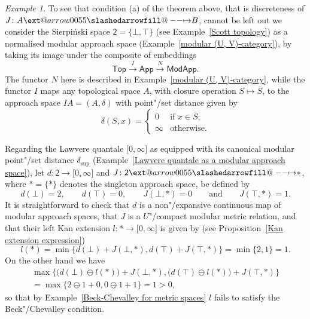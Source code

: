 \documentclass[preprint, a4paper]{elsarticle}
\makeatletter
\def\slashedarrowfill@#1#2#3#4#5{%
  $\m@th\thickmuskip0mu\medmuskip\thickmuskip\thinmuskip\thickmuskip
   \relax#5#1\mkern-7mu%
   \cleaders\hbox{$#5\mkern-2mu#2\mkern-2mu$}\hfill
   \mathclap{#3}\mathclap{#2}%
   \cleaders\hbox{$#5\mkern-2mu#2\mkern-2mu$}\hfill
   \mkern-7mu#4$%
}
\def\rightslashedarrowfill@{%
  \slashedarrowfill@\relbar\relbar\mapstochar\rightarrow}
\newcommand\xslashedrightarrow[2][]{%
  \ext@arrow 0055{\rightslashedarrowfill@}{#1}{#2}}
\def\slashedrightarrow{\xslashedrightarrow{}}
\theoremstyle{definition}
\theoremstyle{remark}
\newtheorem{example}[theorem]{Example}
\providecommand{\exref}[1]{Example~\ref{#1}}
\providecommand{\propref}[1]{Proposition~\ref{#1}}
\providecommand{\xrar}[1]{\xrightarrow{#1}}
\providecommand{\brcs}[1]{\lbrace #1 \rbrace}
\providecommand{\bigbrcs}[1]{\bigl\lbrace #1 \bigr\rbrace}
\providecommand{\brks}[1]{\lbrack #1 \rbrack}
\providecommand{\bigpars}[1]{\bigl(#1\bigr)}
\providecommand{\set}[1]{\brcs{#1}}
\providecommand{\map}[3]{#1\colon#2\to#3}
\providecommand{\hmap}[3]{#1\colon#2\slashedrightarrow#3}
\providecommand{\2}{\mathsf 2}
\providecommand{\Top}{\mathsf{Top}}
\makeatother
\begin{document}
	\begin{example} \label{counter example condition a}
		To see that condition (a) of the theorem above, that is discreteness of $\hmap JAB$, cannot be left out we consider the Sierpi\'nski space $\2 = \set{\bot, \top}$ (see \exref{Scott topology}) as a normalised modular approach space (\exref{modular (U, V)-category}), by taking its image under the composite of embeddings
		\begin{displaymath}
			\Top \xrar I \mathsf{App} \xrar N \mathsf{ModApp}.
		\end{displaymath}
		The functor $N$ here is described in \exref{modular (U, V)-category}, while the functor $I$ maps any topological space $A$, with closure operation $S \mapsto \bar S$, to the approach space $IA = (A, \delta)$ with point"/set distance given by
		\begin{displaymath}
			\delta(S, x) = \begin{cases}
				0 & \text{if $x \in \bar S$;} \\
				\infty & \text{otherwise.}
			\end{cases}
		\end{displaymath}
		
		Regarding the Lawvere quantale $\brks{0, \infty}$ as equipped with its canonical modular point"/set distance $\delta_{\sup}$ (\exref{Lawvere quantale as a modular approach space}), let $\map d\2{\brks{0,\infty}}$ and $\hmap J\2*$, where $* = \set*$ denotes the singleton approach space, be defined by
		\begin{displaymath}
			d(\bot) = 2, \qquad d(\top) = 0, \qquad J(\bot, *) = 0 \qquad \text{and} \qquad J(\top, *) = 1.
		\end{displaymath}
		It is straightforward to check that $d$ is a non"/expansive continuous map of modular approach spaces, that $J$ is a $U$"/compact modular metric relation, and that their left Kan extension \mbox{$\map l*{\brks{0,\infty}}$} is given by (see \propref{Kan extension expression})
		\begin{displaymath}
			l(*) = \min\bigbrcs{d(\bot) + J(\bot, *), d(\top) + J(\top, *)} = \min\set{2, 1} = 1.
		\end{displaymath}
		On the other hand we have
		\begin{multline*}
			\max\bigbrcs{\bigpars{d(\bot) \ominus l(*)} + J(\bot, *), \bigpars{d(\top) \ominus l(*)} + J(\top, *)} \\
			= \textstyle\max\set{2 \ominus 1 + 0, 0 \ominus 1 + 1} = 1 > 0,
		\end{multline*}
		so that by \exref{Beck-Chevalley for metric spaces} $l$ fails to satisfy the Beck"/Chevalley condition.
	\end{example}
	
\end{document}
